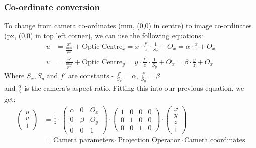 \subsubsection{Co-ordinate conversion}
To change from camera co-ordinates (mm, (0,0) in centre) to image co-ordinates (px, (0,0) in top left corner), we can use the following equations:
\begin{align}
    u &= \frac{x'}{\frac{mm}{px}} + \text{Optic Centre$_x$} = x \cdot \frac{f'}{z} \cdot \frac{1}{S_x} + O_x = \alpha \cdot \frac{x}{z} + O_x \nonumber \\
    v &= \frac{y'}{\frac{mm}{px}} + \text{Optic Centre$_y$} = y \cdot \frac{f'}{z} \cdot \frac{1}{S_y} + O_x = \beta \cdot \frac{y}{z} + O_x \nonumber     
\end{align}
Where $S_x,S_y$ and $f'$ are constants - $\frac{f'}{S_x} = \alpha$, $\frac{f'}{S_y} = \beta$\\ and $\frac{\alpha}{\beta}$ is the camera's aspect ratio. 
Fitting this into our previous equation, we get:
\begin{align}
      \begin{pmatrix}
    u \\ v \\ 1
    \end{pmatrix}
    &=  \frac{1}{z} \cdot 
    \begin{pmatrix}
    \alpha & 0 & O_x\\
    0 & \beta & O_y \\
    0 & 0 & 1 
    \end{pmatrix} \cdot 
    \begin{pmatrix}
    1 & 0 & 0 & 0\\
    0 & 1 & 0 & 0\\
    0 & 0 & 1 & 0
    \end{pmatrix}
    \cdot     \begin{pmatrix}
    x \\ y\\ z\\ 1
    \end{pmatrix}  \\
    &= \text{Camera parameters} \cdot
    \text{Projection Operator} \cdot \text{Camera coordinates} \nonumber
\end{align}

